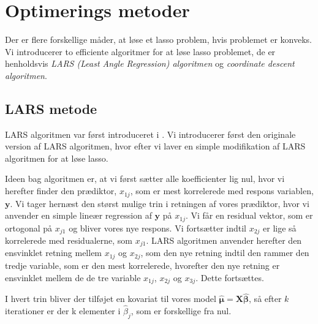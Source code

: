 \chapter{Optimerings metoder} \label{kap:optimeringsmetoder}

Der er flere forskellige måder, at løse et lasso problem, hvis problemet er konveks. 
Vi introducerer to efficiente algoritmer for at løse lasso problemet, de er henholdsvis \textit{ LARS  (Least Angle Regression) algoritmen} og \textit{coordinate descent algoritmen}.

\section{LARS metode}
LARS algoritmen var først introduceret i \citep{efron}.  
Vi introducerer først den originale version af LARS algoritmen, hvor efter vi laver en simple modifikation af LARS algoritmen for at løse lasso. 

Ideen bag algoritmen er, at vi først sætter alle koefficienter lig nul, hvor vi herefter finder den prædiktor, $x_{1j}$, som er mest korrelerede med respons variablen, $\textbf{y}$.  Vi tager hernæst den størst mulige trin i retningen af vores prædiktor, hvor vi anvender en simple lineær regression af $\textbf{y}$ på $x_{1j}$. Vi får en residual vektor, som er ortogonal på $x_{j1}$ og bliver vores nye respons. 
Vi fortsætter indtil $x_{2j}$ er lige så korrelerede  med residualerne, som $x_{j1}$. 
LARS algoritmen anvender herefter den ensvinklet retning mellem $x_{1j}$ og $x_{2j}$, som den nye retning indtil den rammer den tredje variable, som er den mest korrelerede, hvorefter den nye retning er ensvinklet mellem de de tre variable $x_{1j}$, $x_{2j}$ og $x_{3j}$. Dette fortsættes. 

I hvert trin bliver der tilføjet en kovariat til vores model $\widehat{\boldsymbol{\mu}} = \textbf{X} \widehat{\boldsymbol{ \beta}}$, så efter $k$ iterationer er der k elementer i  $\widehat{\beta}_j$, som er forskellige fra nul.  

